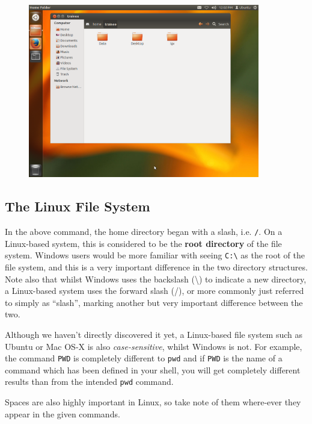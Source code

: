 \documentclass[a4paper,12pt,twoside]{memoir}
\begin{document}
\begin{figure}[h!]
  \centering
    \includegraphics[width=0.9\textwidth]{home}
\end{figure}

\FloatBarrier
\subsection{The Linux File System}
\begin{information}
In the above command, the home directory began with a slash, i.e. \texttt{/}.
On a Linux-based system, this is considered to be the \textbf{root directory} of the file system. 
Windows users would be more familiar with seeing \texttt{C:\textbackslash} as the root of the file system, and this is a very important difference in the two directory structures.
Note also that whilst Windows uses the backslash (\textbackslash) to indicate a new directory, a Linux-based system uses the forward slash (/), or more commonly just referred to simply as ``slash'', marking another but very important difference between the two. \\
\end{information}

\begin{warning}
Although we haven't directly discovered it yet, a Linux-based file system such as Ubuntu or Mac OS-X is also \textit{case-sensitive}, whilst Windows is not.
For example, the command \texttt{PWD} is completely different to \texttt{pwd} and if \texttt{PWD} is the name of a command which has been defined in your shell, you will get completely different results than from the intended \texttt{pwd} command.

Spaces are also highly important in Linux, so take note of them where-ever they appear in the given commands.
\end{warning}
\end{document}
